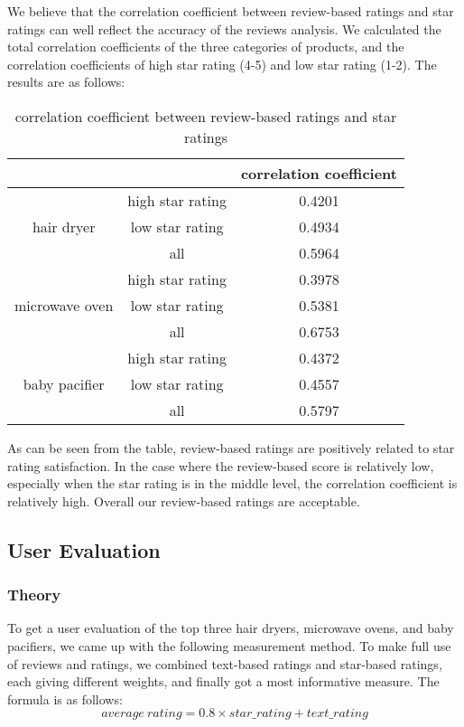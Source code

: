 \documentclass{mcmthesis}
\begin{document}
	We believe that the correlation coefficient between review-based ratings and star ratings can well reflect the accuracy of the reviews analysis. We calculated the total correlation coefficients of the three categories of products, and the correlation coefficients of high star rating (4-5) and low star rating (1-2). The results are as follows:
	
	
	
	\begin{table}[h]
		\begin{center} 
			\caption{correlation coefficient between review-based ratings and star ratings}
			\begin{tabular}{|c|c|c|}
				\hline
				&                  & correlation coefficient \\ \hline
				\multirow{3}{*}{hair dryer}     & high star rating & 0.4201                  \\ \cline{2-3} 
				& low star rating  & 0.4934                  \\ \cline{2-3} 
				& all              & 0.5964                  \\ \hline
				\multirow{3}{*}{microwave oven} & high star rating & 0.3978                  \\ \cline{2-3} 
				& low star rating  & 0.5381                  \\ \cline{2-3} 
				& all              & 0.6753                  \\ \hline
				\multirow{3}{*}{baby pacifier}  & high star rating & 0.4372                  \\ \cline{2-3} 
				& low star rating  & 0.4557                  \\ \cline{2-3} 
				& all              & 0.5797                  \\ \hline
			\end{tabular}
		\end{center}
	\end{table}
	
	
	As can be seen from the table, review-based ratings are positively related to star rating satisfaction. In the case where the review-based score is relatively low, especially when the star rating is in the middle level, the correlation coefficient is relatively high. Overall our review-based ratings are acceptable.
	
	
	\subsection{User Evaluation}
	\subsubsection{Theory}
	To get a user evaluation of the top three hair dryers, microwave ovens, and baby pacifiers, we came up with the following measurement method. To make full use of reviews and ratings, we combined text-based ratings and star-based ratings, each giving different weights, and finally got a most informative measure. The formula is as follows:
	$$
	average\ rating = 0.8 \times star\_rating + text\_rating
	$$
	
\end{document}
